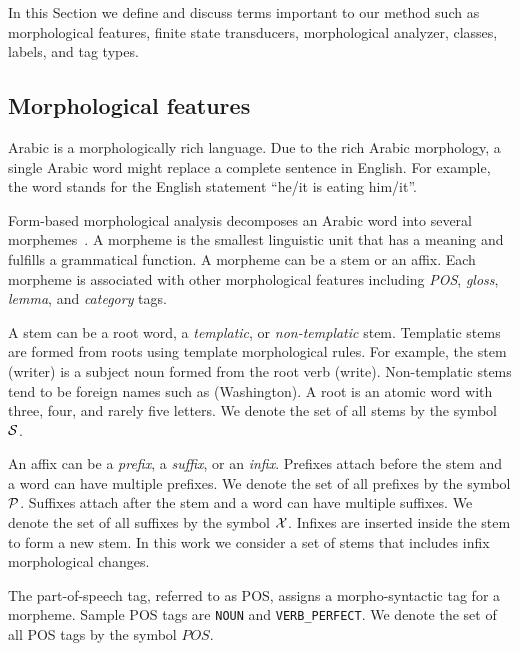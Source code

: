 \setarab

\def\pp{\ensuremath{{\cal P}}} %
\def\ss{\ensuremath{{\cal S}}} %
\def\xx{\ensuremath{{\cal X}}} %
\def\PP{\ensuremath{\mathit{POS}}} %
\def\GG{\ensuremath{\mathit{GLOSS}}} %
\def\AC{\ensuremath{\mathit{CAT}}} %

In this Section we define and discuss terms important to our method such as 
morphological features, finite state transducers, morphological analyzer, 
classes, labels, and tag types.

\subsection{Morphological features}

Arabic is a morphologically rich language. 
Due to the rich Arabic morphology, a single Arabic word 
might replace a complete sentence in English. 
For example, the word 
stands for the English 
statement ``he/it is eating him/it''.

Form-based morphological analysis decomposes an Arabic word into
several morphemes~\cite{habash2010introduction}.
A morpheme is the smallest linguistic unit 
that has a meaning and fulfills a grammatical function. 
A morpheme can be a stem or an affix. 
Each morpheme is associated with other morphological features 
including {\em POS}, {\em gloss}, {\em lemma}, and {\em category} tags. 

A stem can be a root word, a {\em templatic}, or {\em non-templatic} stem. 
Templatic stems are formed from roots using template morphological rules. 
For example, the stem
 (writer) is a subject noun formed from the root verb  (write). 
Non-templatic stems tend to be foreign names such as  (Washington). 
A root is an atomic word with three, four, and rarely five letters.
We denote the set of all stems by the symbol \ss.

An affix can be a {\em prefix}, a {\em suffix}, or an {\em infix}. 
Prefixes attach before the stem and a word can have multiple prefixes. 
We denote the set of all prefixes by the symbol \pp. 
Suffixes attach after the stem and a word can have multiple suffixes. 
We denote the set of all suffixes by the symbol \xx.
Infixes are inserted inside the stem to form a new stem. 
In this work we consider a set of stems that includes infix morphological changes. 

The part-of-speech tag, referred to as POS, assigns a morpho-syntactic tag for a morpheme. 
Sample POS tags are {\tt NOUN} and {\tt VERB\_PERFECT}. 
We denote the set of all POS tags by the symbol \PP.

